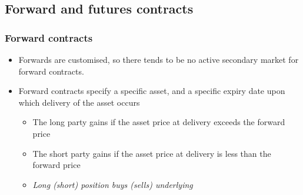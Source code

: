 \documentclass[../notes_compiled.tex]{subfiles}
\begin{document}
\begin{itemize}
\subsection{Forward and futures contracts}
\subsubsection{Forward contracts}
\begin{itemize}
\item Forwards are customised, so there tends to be no active secondary market for forward contracts.
\item Forward contracts specify a specific asset, and a specific expiry date upon which delivery of the asset occurs
\begin{itemize}
\item The long party gains if the asset price at delivery exceeds the forward price
\item The short party gains if the asset price at delivery is less than the forward price
\item[] \emph{Long (short) position buys (sells) underlying}
\end{itemize}


\end{itemize}
\end{itemize}
\end{document}
